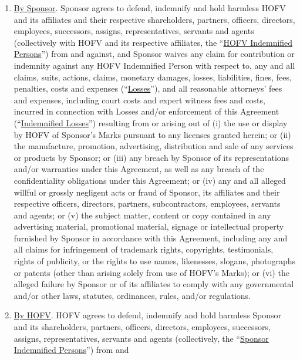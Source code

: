 \documentclass[]{article}
\begin{document}
\begin{enumerate}
  \begin{enumerate}
  \def\labelenumii{\arabic{enumii}.}
  \item
    \uline{By Sponsor}. Sponsor agrees to defend, indemnify and hold
    harmless HOFV and its affiliates and their respective shareholders,
    partners, officers, directors, employees, successors, assigns,
    representatives, servants and agents (collectively with HOFV and its
    respective affiliates, the ``\uline{HOFV Indemnified Persons}'')
    from and against, and Sponsor waives any claim for contribution or
    indemnity against any HOFV Indemnified Person with respect to, any
    and all claims, suits, actions, claims, monetary damages, losses,
    liabilities, fines, fees, penalties, costs and expenses
    (``\uline{Losses}''), and all reasonable attorneys' fees and
    expenses, including court costs and expert witness fees and costs,
    incurred in connection with Losses and/or enforcement of this
    Agreement (``\uline{Indemnified Losses}'') resulting from or arising
    out of (i) the use or display by HOFV of Sponsor's Marks pursuant to
    any licenses granted herein; or (ii) the manufacture, promotion,
    advertising, distribution and sale of any services or products by
    Sponsor; or (iii) any breach by Sponsor of its representations
    and/or warranties under this Agreement, as well as any breach of the
    confidentiality obligations under this Agreement; or (iv) any and
    all alleged willful or grossly negligent acts or fraud of Sponsor,
    its affiliates and their respective officers, directors, partners,
    subcontractors, employees, servants and agents; or (v) the subject
    matter, content or copy contained in any advertising material,
    promotional material, signage or intellectual property furnished by
    Sponsor in accordance with this Agreement, including any and all
    claims for infringement of trademark rights, copyrights,
    testimonials, rights of publicity, or the rights to use names,
    likenesses, slogans, photographs or patents (other than arising
    solely from use of HOFV's Marks); or (vi) the alleged failure by
    Sponsor or of its affiliates to comply with any governmental and/or
    other laws, statutes, ordinances, rules, and/or regulations.
  \item
    \uline{By HOFV}. HOFV agrees to defend, indemnify and hold harmless
    Sponsor and its shareholders, partners, officers, directors,
    employees, successors, assigns, representatives, servants and agents
    (collectively, the ``\uline{Sponsor Indemnified Persons}'') from and

\end{enumerate}
\end{enumerate}
\end{document}
